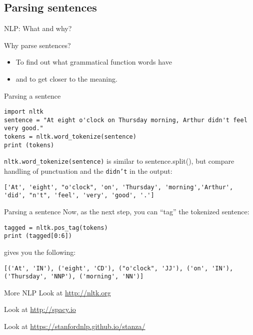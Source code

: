 \documentclass{beamer}
\begin{document}
\subsection{Parsing sentences}
\begin{frame}{NLP: What and why?}
\begin{block}{Why parse sentences?}
\begin{itemize}
\item To find out what grammatical function words have
\item and to get closer to the meaning.
\end{itemize}
\end{block}
\end{frame}

\begin{frame}[fragile]{Parsing a sentence}
\begin{lstlisting}
import nltk
sentence = "At eight o'clock on Thursday morning, Arthur didn't feel very good."
tokens = nltk.word_tokenize(sentence)
print (tokens)
\end{lstlisting}

\texttt{nltk.word\_tokenize(sentence)} is similar to sentence.split(), but compare handling of punctuation and the \texttt{didn't} in the output:
\begin{lstlisting}
['At', 'eight', "o'clock", 'on', 'Thursday', 'morning','Arthur', 'did', "n't", 'feel', 'very', 'good', '.']
\end{lstlisting}
\end{frame}


\begin{frame}[fragile]{Parsing a sentence}
Now, as the next step, you can ``tag'' the tokenized sentence:
\begin{lstlisting}
tagged = nltk.pos_tag(tokens)
print (tagged[0:6])
\end{lstlisting}
gives you the following:
\begin{lstlisting}
[('At', 'IN'), ('eight', 'CD'), ("o'clock", 'JJ'), ('on', 'IN'),
('Thursday', 'NNP'), ('morning', 'NN')]
\end{lstlisting}


\end{frame}


\begin{frame}{More NLP}
  \Huge{Look at \url{http://nltk.org}}

  \Huge{Look at \url{http://spacy.io}}

  \Huge{Look at \url{https://stanfordnlp.github.io/stanza/}}



\end{frame}
\end{document}
